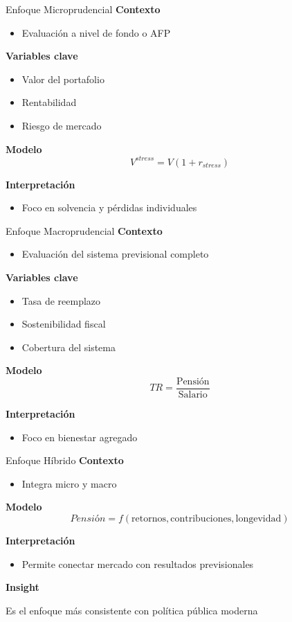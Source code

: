 \documentclass{beamer}
\begin{document}
\begin{frame}{Enfoque Microprudencial}
\textbf{Contexto}
\begin{itemize}
\item Evaluación a nivel de fondo o AFP
\end{itemize}

\textbf{Variables clave}
\begin{itemize}
\item Valor del portafolio
\item Rentabilidad
\item Riesgo de mercado
\end{itemize}

\textbf{Modelo}
\[
V^{stress} = V (1 + r_{stress})
\]

\textbf{Interpretación}
\begin{itemize}
\item Foco en solvencia y pérdidas individuales
\end{itemize}
\end{frame}

\begin{frame}{Enfoque Macroprudencial}
\textbf{Contexto}
\begin{itemize}
\item Evaluación del sistema previsional completo
\end{itemize}

\textbf{Variables clave}
\begin{itemize}
\item Tasa de reemplazo
\item Sostenibilidad fiscal
\item Cobertura del sistema
\end{itemize}

\textbf{Modelo}
\[
TR = \frac{\text{Pensión}}{\text{Salario}}
\]

\textbf{Interpretación}
\begin{itemize}
\item Foco en bienestar agregado
\end{itemize}
\end{frame}

\begin{frame}{Enfoque Híbrido}
\textbf{Contexto}
\begin{itemize}
\item Integra micro y macro
\end{itemize}

\textbf{Modelo}
\[
Pensión = f(\text{retornos}, \text{contribuciones}, \text{longevidad})
\]

\textbf{Interpretación}
\begin{itemize}
\item Permite conectar mercado con resultados previsionales
\end{itemize}

\textbf{Insight}
\begin{block}{}
Es el enfoque más consistente con política pública moderna
\end{block}
\end{frame}
\end{document}
